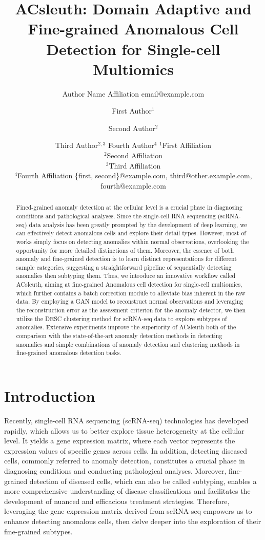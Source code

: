 \documentclass{article}
\title{ACsleuth: Domain Adaptive and Fine-grained Anomalous Cell Detection for Single-cell Multiomics}
\author{
    Author Name
    \affiliations
    Affiliation
    \emails
    email@example.com
}
\author{
First Author$^1$
\and
Second Author$^2$\and
Third Author$^{2,3}$\And
Fourth Author$^4$
\affiliations
$^1$First Affiliation\\
$^2$Second Affiliation\\
$^3$Third Affiliation\\
$^4$Fourth Affiliation
\emails
\{first, second\}@example.com,
third@other.example.com,
fourth@example.com
}
\begin{document}
\setlength{\parindent}{0pt}
\setlength{\parskip}{0pt}



\maketitle

\begin{abstract}
    Fined-grained anomaly detection at the cellular level is a crucial phase in diagnosing 
    conditions and pathological analyses. Since the single-cell RNA sequencing (scRNA-seq) 
    data analysis has been greatly prompted by the development of deep learning, we can 
    effectively detect anomalous cells and explore their detail types. However, most of 
    works simply focus on detecting anomalies within normal observations, overlooking the 
    opportunity for more detailed distinctions of them. Moreover, the essence of both 
    anomaly and fine-grained detection is to learn distinct representations for different 
    sample categories, suggesting a straightforward pipeline of sequentially detecting 
    anomalies then subtyping them. Thus, we introduce an innovative workflow called ACsleuth, 
    aiming at fine-grained Anomalous cell detection for single-cell multiomics, which 
    further contains a batch correction module to alleviate bias inherent in the raw 
    data. By employing a GAN model to reconstruct normal observations and leveraging the 
    reconstruction error as the assessment criterion for the anomaly detector, we then 
    utilize the DESC clustering method for scRNA-seq data to explore subtypes of anomalies. 
    Extensive experiments improve the superiority of ACsleuth both of the comparison with the 
    state-of-the-art anomaly detection methods in detecting anomalies and simple 
    combinations of anomaly detection and clustering methods in fine-grained anomalous detection tasks.
\end{abstract}

\section{Introduction}

Recently, single-cell RNA sequencing (scRNA-seq) technologies has developed rapidly, 
which allows us to better explore tissue heterogeneity at the cellular level. It yields 
a gene expression matrix, where each vector represents the expression values of specific 
genes across cells. In addition, detecting diseased cells, commonly referred to anomaly 
detection, constitutes a crucial phase in diagnosing conditions and conducting pathological 
analyses. Moreover, fine-grained detection of diseased cells, which can also be called subtyping, enables a more comprehensive 
understanding of disease classifications and facilitates the development of nuanced and 
efficacious treatment strategies. Therefore, leveraging the gene expression matrix derived 
from scRNA-seq empowers us to enhance detecting anomalous cells, then delve deeper into 
the exploration of their fine-grained subtypes.
\end{document}

